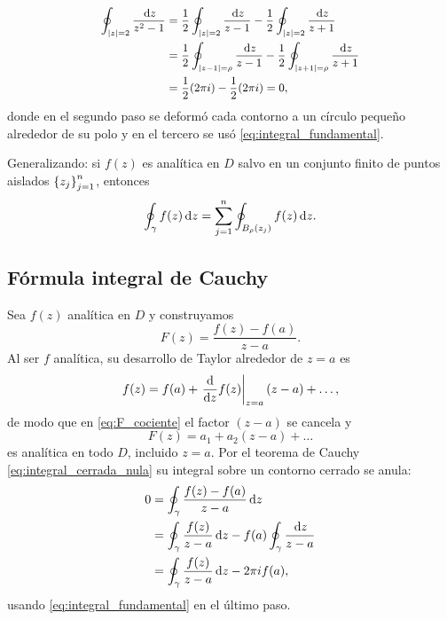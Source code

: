 \begin{ejemplo}
  \label{ej:fracciones_parciales}
  \begin{equation}
    \label{eq:fracciones_parciales}
    \small
    \begin{aligned}
      \oint_{\lvert z \rvert=2}\frac{\,\mathrm{d} z}{z^2-1}
        &=\frac{1}{2}\oint_{\lvert z \rvert=2}\frac{\,\mathrm{d} z}{z-1}
         -\frac{1}{2}\oint_{\lvert z \rvert=2}\frac{\,\mathrm{d} z}{z+1}\\
        &=\frac{1}{2}\oint_{\lvert z-1 \rvert=\rho}\frac{\,\mathrm{d} z}{z-1}
         -\frac{1}{2}\oint_{\lvert z+1 \rvert=\rho}\frac{\,\mathrm{d} z}{z+1}\\
        &=\frac{1}{2}(2\pi i)-\frac{1}{2}(2\pi i)=0 ,
    \end{aligned}
  \end{equation}
  donde en el segundo paso se deform\'o cada contorno a un c\'irculo peque\~no
  alrededor de su polo y en el tercero se us\'o
  \eqref{eq:integral_fundamental}.
\end{ejemplo}

Generalizando: si $f(z)$ es anal\'itica en $D$ salvo en un conjunto finito de
puntos aislados $\left\{ z_j \right\}_{j=1}^{n}$, entonces
\begin{equation}
  \label{eq:deformacion_general}
  \oint_{\gamma}f(z)\,\mathrm{d} z
    =\sum_{j=1}^{n}\oint_{B_\rho(z_j)}f(z)\,\mathrm{d} z .
\end{equation}

\subsection{F\'ormula integral de Cauchy}
\label{subsec:formula_cauchy}

Sea $f(z)$ anal\'itica en $D$ y construyamos
\begin{equation}
  \label{eq:F_cociente}
  F(z)=\frac{f(z)-f(a)}{z-a} .
\end{equation}
Al ser $f$ anal\'itica, su desarrollo de Taylor alrededor de $z=a$ es
\begin{equation}
  \label{eq:taylor_en_a}
  f(z)=f(a)+\left. \frac{\mathrm{d}}{\mathrm{d}z}f(z) \right|_{z=a}(z-a)+\dots,
\end{equation}
de modo que en \eqref{eq:F_cociente} el factor $(z-a)$ se cancela y
\begin{equation}
  \label{eq:F_analitica}
  F(z)=a_1+a_2(z-a)+\dots
\end{equation}
es anal\'itica en todo $D$, incluido $z=a$. Por el teorema de Cauchy
\eqref{eq:integral_cerrada_nula} su integral sobre un contorno cerrado se
anula:
\begin{equation}
  \label{eq:derivacion_fic}
  \begin{aligned}
    0&=\oint_{\gamma}\frac{f(z)-f(a)}{z-a}\,\mathrm{d} z\\
     &=\oint_{\gamma}\frac{f(z)}{z-a}\,\mathrm{d} z
       -f(a)\oint_{\gamma}\frac{\,\mathrm{d} z}{z-a}\\
     &=\oint_{\gamma}\frac{f(z)}{z-a}\,\mathrm{d} z-2\pi i f(a),
  \end{aligned}
\end{equation}
usando \eqref{eq:integral_fundamental} en el \'ultimo paso.


